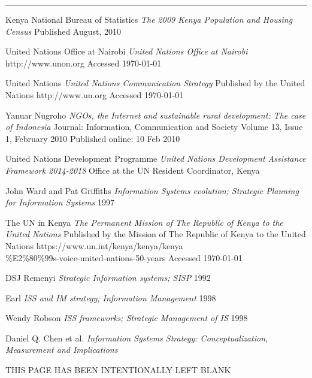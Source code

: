 \documentclass[12pt]{article}
\begin{document}
\vspace{1cm}
\hrule width1.5in height1pt
\vspace{1cm}

\newpage

\begin{thebibliography}{9}

Kenya National Bureau of Statistics
\emph{The 2009 Kenya Population and Housing Census}
Published August, 2010

United Nations Office at Nairobi
\emph{United Nations Office at Nairobi}
http://www.unon.org
Accessed \today

United Nations
\emph{United Nations Communication Strategy}
Published by the United Nations
http://www.un.org
Accessed \today

Yanuar Nugroho
\emph{NGOs, the Internet and sustainable rural development: The case of Indonesia}
Journal: Information, Communication and Society
Volume 13, Issue 1, February 2010
Published online: 10 Feb 2010

United Nations Development Programme
\emph{United Nations Development Assistance Framework 2014-2018}
Office at the UN Resident Coordinator, Kenya

John Ward and Pat Griffiths
\emph{Information Systems evolution; Strategic Planning for Information Systems}
1997

The UN in Kenya
\emph{The Permanent Mission of The Republic of Kenya to the United Nations}
Published by the Mission of The Republic of Kenya to the United Nations
https://www.un.int/kenya/kenya/kenya\\\%E2\%80\%99s-voice-united-nations-50-years
Accessed \today

DSJ Remenyi 
\emph{Strategic Information systems; SISP}
1992

Earl
\emph{ISS and IM strategy; Information Management}
1998

Wendy Robson
\emph{ISS frameworks; Strategic Management of IS}
1998
  
Daniel Q. Chen et al.
\emph{Information Systems Strategy: Conceptualization, Measurement and Implications}



\end{thebibliography}

\newpage
\thispagestyle{empty}
\vspace*{\fill}
THIS PAGE HAS BEEN INTENTIONALLY LEFT BLANK
\vspace*{\fill}
\end{document}

